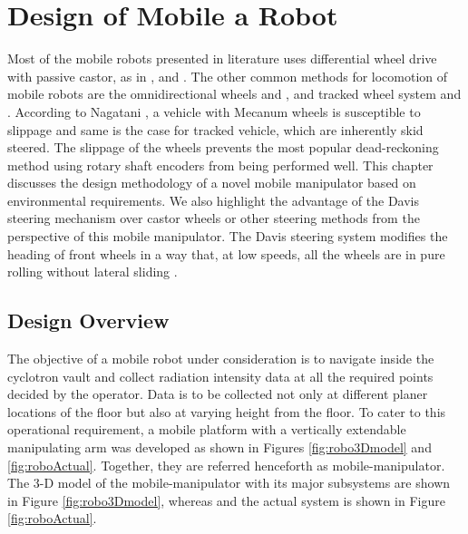 \chapter{Design of Mobile a Robot}
\label{ch_3:Design}

Most of the mobile robots presented in literature uses differential wheel drive  with passive castor, as in \cite{yamamoto1992coordinating}, \cite{rajendran2004} and \cite{saha1989kinematics}. The other  common methods for locomotion of mobile robots are the omnidirectional wheels  \cite{pin1994new} and \cite{salih2006designing}, and tracked wheel system \cite{suthakorn2009design} and \cite{guarnieri2004development}. According  to  Nagatani \cite{nagatani2000improvement},  a  vehicle  with  Mecanum  wheels  is  susceptible  to slippage and same is the case for tracked vehicle, which are inherently skid steered. The slippage of the wheels prevents the most popular dead-reckoning method using rotary shaft  encoders   from  being  performed  well. This chapter   discusses the  design methodology of a novel mobile manipulator based on environmental requirements. We also  highlight the advantage of the Davis steering mechanism over castor wheels  or other steering methods from the perspective of this mobile manipulator.   The Davis steering system modifies the heading of  front wheels in a way that, at low speeds, all the wheels are in pure rolling without lateral sliding \cite{wong2008theory}.  


\section{Design Overview}
 The objective of a  mobile robot under consideration is to navigate inside the cyclotron vault and collect radiation intensity data at all the required points decided by the operator. Data is to be collected not only at different planer locations of the floor but also at varying height from the floor. To cater to this operational requirement, a mobile platform with a vertically extendable manipulating arm was developed as shown in  Figures \ref{fig:robo3Dmodel} and \ref{fig:roboActual}. Together, they are   referred henceforth as mobile-manipulator. The 3-D model of the mobile-manipulator with its major subsystems are shown in Figure \ref{fig:robo3Dmodel}, whereas  and the actual   system  is shown in Figure  \ref{fig:roboActual}. 

